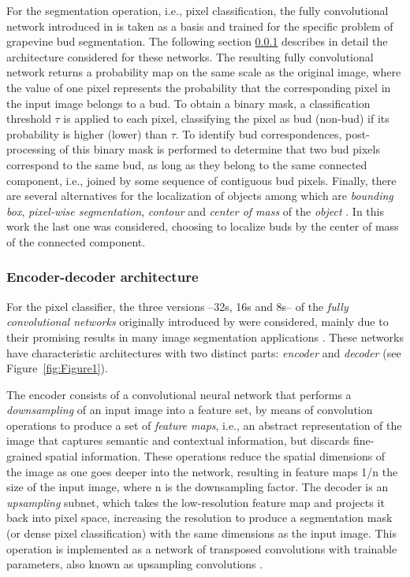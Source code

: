 \documentclass[a4paper,authoryear,review]{elsarticle}
\begin{document}
For the segmentation operation, i.e., pixel classification, the fully convolutional network introduced in \citep{long2015fully} is taken as a basis and trained for the specific problem of grapevine bud segmentation. The following section  \ref{sec:fcnmn} describes in detail the architecture considered for these networks. The resulting fully convolutional network returns a probability map on the same scale as the original image, where the value of one pixel represents the probability that the corresponding pixel in the input image belongs to a bud. To obtain a binary mask, a classification threshold $\tau$ is applied to each pixel, classifying the pixel as bud (non-bud) if its probability is higher (lower) than $\tau$. To identify bud correspondences, post-processing of this binary mask is performed to determine that two bud pixels correspond to the same bud, as long as they belong to the same connected component, i.e., joined by some sequence of contiguous bud pixels. 
%
Finally, there are several alternatives for the localization of objects among which are \emph{bounding box}, \emph{pixel-wise segmentation}, \emph{contour} and \emph{center of mass} of the \emph{object} \citep{lampert2008beyond}. In this work the last one was considered, choosing to localize buds by the center of mass of the connected component. 

\subsubsection {Encoder-decoder architecture}
\label{sec:fcnmn}

For the pixel classifier, the three versions --32s, 16s and 8s--  of the \emph{fully convolutional networks} originally introduced by \citet{long2015fully} were considered, mainly due to their promising results in many image segmentation applications \citep{litjens2017survey, garcia2018survey, kaymak2019brief}. These networks have characteristic architectures with two distinct parts: \emph{encoder} and \emph{decoder} (see Figure~\ref{fig:Figure1}). 

The encoder consists of a convolutional neural network that performs a \emph{downsampling} of an input image into a feature set, by means of convolution operations to produce a set of \emph{feature maps}, i.e., an abstract representation of the image that captures semantic and contextual information, but discards fine-grained spatial information. These operations reduce the spatial dimensions of the image as one goes deeper into the network, resulting in feature maps 1/n the size of the input image, where n is the downsampling factor. The decoder is an \emph{upsampling} subnet, which takes the low-resolution feature map and projects it back into pixel space, increasing the resolution to produce a segmentation mask (or dense pixel classification) with the same dimensions as the input image. This operation is implemented as a network of transposed convolutions with trainable parameters, also known as upsampling convolutions \citep{shelhamer2017fully}. 
\end{document}
